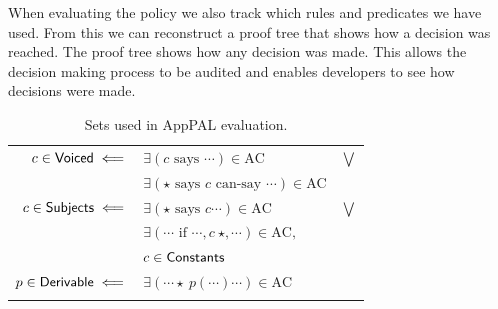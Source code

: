 \documentclass[thesis.tex]{subfiles}
\begin{document}
When evaluating the policy we also track which rules and predicates we have used.
From this we can reconstruct a proof tree that shows how a decision was reached.
The proof tree shows how any decision was made.
This allows the decision making process to be audited and enables developers to see how decisions were made.

\begin{table}
  \centering
  \newcommand{\myset}[1]{\ensuremath{\text{\sffamily #1}}}
  \begin{tabular}{r l c}
    \toprule
    $c \in \myset{Voiced} \impliedby$     & $\exists \left(c \text{~says~} \cdots\right) \in \text{AC}$                        & $\bigvee$ \\
                                          & $\exists \left(\star \text{~says~} c \text{~can-say~} \cdots\right) \in \text{AC}$ &           \\
    $c \in \myset{Subjects} \impliedby$   & $\exists \left(\star \text{~says~} c\cdots\right) \in \text{AC}$                   & $\bigvee$ \\
                                          & $\exists \left(\cdots \text{~if~} \cdots,c~\star,\cdots\right) \in \text{AC},$     &           \\
                                          & $c \in \myset{Constants}$                                                          &           \\
    $p \in \myset{Derivable} \impliedby$  & $\exists \left( \cdots \star~p\left(\cdots\right) \cdots\right) \in \text{AC}$     &           \\
    \bottomrule                          \\
  \end{tabular}
  \caption{Sets used in AppPAL evaluation.}
  \label{tab:apppal-sets}
\end{table}
\end{document}
